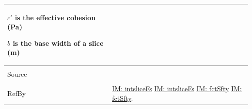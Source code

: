 \documentclass[12pt]{article}
\begin{document}
\begin{minipage}{\textwidth}
\begin{tabular}{p{} p{}}
\begin{symbDescription}
                                 \item{$c'$ is the effective cohesion (Pa)}
                                 \item{$b$ is the base width of a slice (m)}
                                 \end{symbDescription}
                                 \\ \midrule \\
                                 Source & \cite{chen2005}
                                          \\ \midrule \\
                                          RefBy & \hyperref[IM:intsliceFs]{IM: intsliceFs} \hyperref[IM:intsliceFs]{IM: intsliceFs} \hyperref[IM:fctSfty]{IM: fctSfty} \hyperref[IM:fctSfty]{IM: fctSfty}.
\\ \bottomrule \end{tabular}
\end{minipage}\\
~\newline
\end{document}
